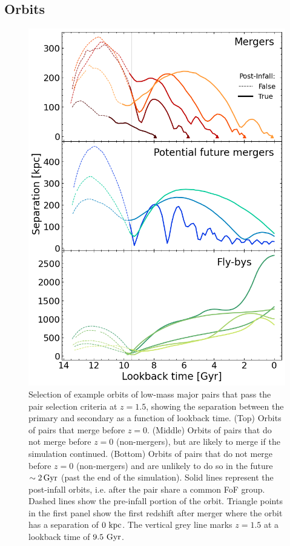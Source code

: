 \documentclass[twocolumn,linenumbers]{aastex631}
\begin{document}
\subsection{Orbits} 
\begin{figure}[tb]
    \begin{center}
    \includegraphics[width=\columnwidth]{plots/bet-on-it/5_exampleorbits.png}
    \caption{Selection of example orbits of low-mass major pairs that pass the pair selection criteria at $z=1.5$, showing the separation between the primary and secondary as a function of lookback time. 
    (Top) Orbits of pairs that merge before $z=0$.
    (Middle) Orbits of pairs that do not merge before $z=0$ (non-mergers), but are likely to merge if the simulation continued. 
    (Bottom) Orbits of pairs that do not merge before $z=0$ (non-mergers) and are unlikely to do so in the future $\sim2\mathrm{\,Gyr}$ (past the end of the simulation).
    Solid lines represent the post-infall orbits, i.e. after the pair share a common FoF group.
    Dashed lines show the pre-infall portion of the orbit. 
    Triangle points in the first panel show the first redshift after merger where the orbit has a separation of $0\,\mathrm{\,kpc}$.
    The vertical grey line marks $z=1.5$ at a lookback time of $9.5\,\mathrm{\,Gyr}$. 
    }
    \label{fig:example-orbits}
    \end{center}
\end{figure}
\end{document}

